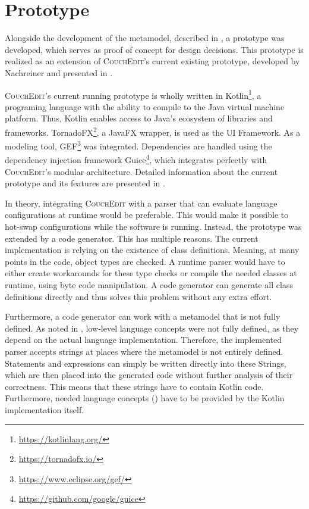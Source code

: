 \chapter{Prototype}
\label{ch:prototype}
Alongside the development of the metamodel, described in , a prototype was developed, which serves as proof of concept for design decisions. This prototype is realized as an extension of \textsc{CouchEdit}'s current existing prototype, developed by Nachreiner and presented in \cite{nachreiner_couchedit_2020}.

\textsc{CouchEdit}'s current running prototype is wholly written in Kotlin\footnote{\url{https://kotlinlang.org/}}, a programing language with the ability to compile to the Java virtual machine platform. Thus, Kotlin enables access to Java's ecosystem of libraries and frameworks. TornadoFX\footnote{\url{https://tornadofx.io/}}, a JavaFX wrapper, is used as the UI Framework. As a modeling tool, GEF\footnote{\url{https://www.eclipse.org/gef/}} was integrated. Dependencies are handled using the dependency injection framework Guice\footnote{\url{https://github.com/google/guice}}, which integrates perfectly with \textsc{CouchEdit}'s modular architecture. Detailed information about the current prototype and its features are presented in \cite{nachreiner_couchedit_2020}.

In theory, integrating \textsc{CouchEdit} with a parser that can evaluate language configurations at runtime would be preferable. This would make it possible to hot-swap configurations while the software is running. Instead, the prototype was extended by a code generator. This has multiple reasons. The current implementation is relying on the existence of class definitions. Meaning, at many points in the code, object types are checked. A runtime parser would have to either create workarounds for these type checks or compile the needed classes at runtime, using byte code manipulation. A code generator can generate all class definitions directly and thus solves this problem without any extra effort. 

Furthermore, a code generator can work with a metamodel that is not fully defined. As noted in , low-level language concepts were not fully defined, as they depend on the actual language implementation. Therefore, the implemented parser accepts strings at places where the metamodel is not entirely defined. Statements and expressions can simply be written directly into these Strings, which are then placed into the generated code without further analysis of their correctness. This means that these strings have to contain Kotlin code. Furthermore, needed language concepts () have to be provided by the Kotlin implementation itself.

